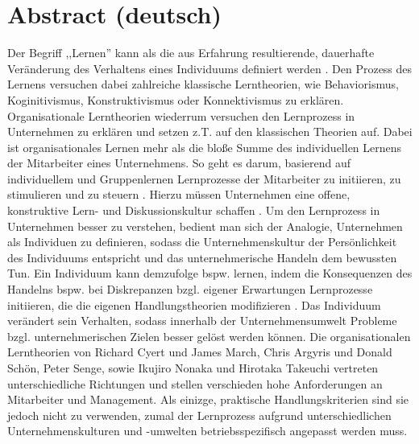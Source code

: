 \documentclass[12pt]{article}
\begin{document}
\maketitle

\section{Abstract (deutsch)}

Der Begriff ,,Lernen'' kann als die aus Erfahrung resultierende, dauerhafte
Veränderung des Verhaltens eines Individuums definiert werden
\cite{Lefrancois:2006}. Den Prozess des Lernens versuchen dabei zahlreiche
klassische Lerntheorien, wie Behaviorismus, Koginitivismus, Konstruktivismus
oder Konnektivismus zu erklären. Organisationale Lerntheorien wiederrum
versuchen den Lernprozess in Unternehmen zu erklären und setzen z.T. auf den
klassischen Theorien auf. Dabei ist organisationales Lernen mehr als die bloße
Summe des individuellen Lernens der Mitarbeiter eines Unternehmens. So geht es
darum, basierend auf individuellem und Gruppenlernen Lernprozesse der
Mitarbeiter zu initiieren, zu stimulieren und zu steuern \cite{Franken:2002}.
Hierzu müssen Unternehmen eine offene, konstruktive Lern- und Diskussionskultur
schaffen \cite{culture}.
Um den Lernprozess in Unternehmen besser zu verstehen, bedient man sich der
Analogie, Unternehmen als Individuen zu definieren, sodass die
Unternehmenskultur der Persönlichkeit des Individuums entspricht und das
unternehmerische Handeln dem bewussten Tun. Ein Individuum kann demzufolge
bspw. lernen, indem die Konsequenzen des Handelns bspw. bei Diskrepanzen bzgl.
eigener Erwartungen Lernprozesse initiieren, die die eigenen Handlungstheorien
modifizieren \cite{Pawlowsky:1992}. Das Individuum verändert sein Verhalten,
sodass innerhalb der Unternehmensumwelt Probleme bzgl. unternehmerischen Zielen
besser gelöst werden können. Die organisationalen Lerntheorien von Richard
Cyert und James March, Chris Argyris und Donald Schön, Peter Senge, sowie
Ikujiro Nonaka und Hirotaka Takeuchi vertreten unterschiedliche Richtungen und
stellen verschieden hohe Anforderungen an Mitarbeiter und Management. Als
einizge, praktische Handlungskriterien sind sie jedoch nicht zu verwenden,
zumal der Lernprozess aufgrund unterschiedlichen Unternehmenskulturen und
-umwelten betriebsspezifisch angepasst werden muss.
\end{document}
